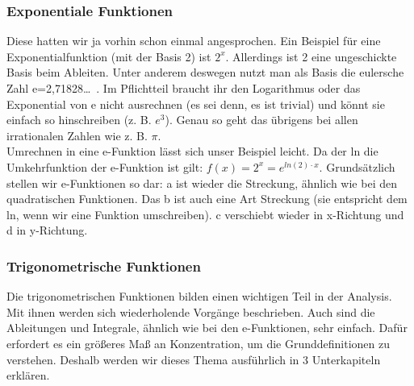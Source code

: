	\subsubsection{Exponentiale Funktionen}
		Diese hatten wir ja vorhin schon einmal angesprochen. Ein Beispiel für eine
		Exponentialfunktion (mit der Basis 2) ist \(2^x\). Allerdings ist 2 eine
		ungeschickte Basis beim Ableiten. Unter anderem deswegen nutzt man als Basis
		die eulersche Zahl e=2,71828\ldots \ . Im Pflichtteil braucht ihr den
		Logarithmus oder das Exponential von e nicht ausrechnen (es sei denn, es ist
		trivial) und könnt sie einfach so hinschreiben (z. B. \(e^3\)). Genau so geht
		das übrigens bei allen irrationalen Zahlen wie z. B. \(\pi\).\\
		Umrechnen in eine e-Funktion lässt sich unser Beispiel leicht. Da der ln die
		Umkehrfunktion der e-Funktion ist gilt: \(f(x)=2^x=e^{ln(2)\cdot x}\).
		Grundsätzlich stellen wir e-Funktionen so dar:
		\formel{\[f(x)=a \cdot e^{b(x-c)}+d\]}
		a ist wieder die Streckung, ähnlich wie bei den quadratischen Funktionen. Das
		b ist auch eine Art Streckung (sie entspricht dem ln, wenn wir eine Funktion
		umschreiben). c verschiebt wieder in x-Richtung und d in y-Richtung.\\

	\subsubsection{Trigonometrische Funktionen}
		Die trigonometrischen Funktionen bilden einen wichtigen Teil in der Analysis.
		Mit ihnen werden sich wiederholende Vorgänge beschrieben. Auch sind die
		Ableitungen und Integrale, ähnlich wie bei den e-Funktionen, sehr einfach.
		Dafür erfordert es ein größeres Maß an Konzentration, um die Grunddefinitionen
		zu verstehen. Deshalb werden wir dieses Thema ausführlich in 3 Unterkapiteln
		erklären.
		
